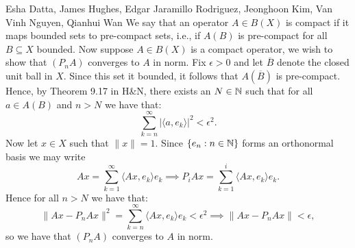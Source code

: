 

\begin{solution}{Esha Datta, James Hughes, Edgar Jaramillo Rodriguez, Jeonghoon Kim, Van Vinh Nguyen, Qianhui Wan}
        We say that an operator $A\in B(X)$ is compact if it maps bounded sets to pre-compact sets, i.e., if $A(B)$ is pre-compact for all $B\subseteq X$ bounded.
        Now suppose $A\in B(X)$ is a compact operator, we wish to show that $(P_n A)$ converges to $A$ in norm.
        Fix $\epsilon >0$ and let $\overline{B}$ denote the closed unit ball in $X$.
        Since this set it bounded, it follows that $A(\overline{B})$ is pre-compact.
        Hence, by Theorem 9.17 in H\&N, there exists an $N\in \mathbb{N}$ such that for all $a\in A(B)$ and $n >N$ we have that:
        \begin{equation*}
            \sum_{k=n}^\infty |\langle a, e_k \rangle|^2 < \epsilon^2.
        \end{equation*}
        Now let $x\in X$ such that $\lVert x \rVert=1$. Since $\{e_n:n\in\mathbb{N}\}$ forms an orthonormal basis we may write
        \begin{equation*}
            Ax = \sum_{k=1}^\infty \langle Ax, e_k \rangle e_k \implies P_iAx = \sum_{k=1}^i \langle Ax, e_k \rangle e_k.
        \end{equation*}
        Hence for all $n >N$ we have that:
        \begin{equation*}
                \lVert Ax-P_nAx \rVert^2 = \sum_{k=n}^\infty \langle Ax, e_k \rangle e_k < \epsilon^2 \implies \lVert Ax-P_nAx \rVert < \epsilon,
        \end{equation*}
        so we have that $(P_nA)$ converges to $A$ in norm.


\end{solution}
